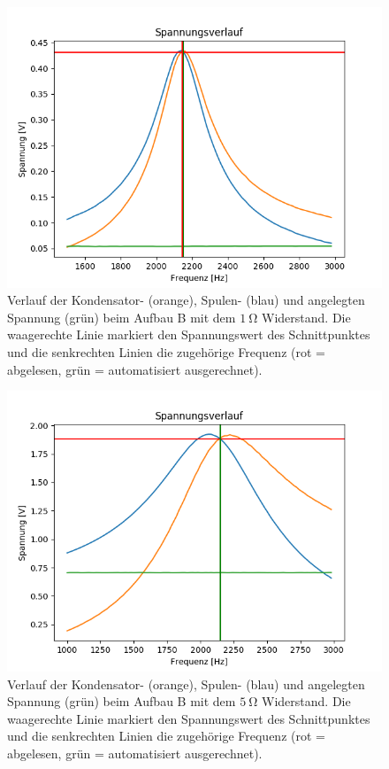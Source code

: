 \documentclass[12pt,a4paper]{article}
\begin{document}
\begin{figure}
	\centering
	\includegraphics[scale=0.8]{Bilder/Serie_Spannungsueberhoehung_B_1.png}
	\caption{Verlauf der Kondensator- (orange), Spulen- (blau) und angelegten Spannung (grün) beim Aufbau B mit dem $\SI{1}{\ohm}$ Widerstand. Die waagerechte Linie markiert den Spannungswert des Schnittpunktes und die senkrechten Linien die zugehörige Frequenz (rot = abgelesen, grün = automatisiert ausgerechnet).}
	\label{fig:Serie_Spannungsueberhoehung_B_1}
\end{figure}
\begin{figure}
	\centering
	\includegraphics[scale=0.8]{Bilder/Serie_Spannungsueberhoehung_B_5.png}
	\caption{Verlauf der Kondensator- (orange), Spulen- (blau) und angelegten Spannung (grün) beim Aufbau B mit dem $\SI{5}{\ohm}$ Widerstand. Die waagerechte Linie markiert den Spannungswert des Schnittpunktes und die senkrechten Linien die zugehörige Frequenz (rot = abgelesen, grün = automatisiert ausgerechnet).}
	\label{fig:Serie_Spannungsueberhoehung_B_5}
\end{figure}
\end{document}
